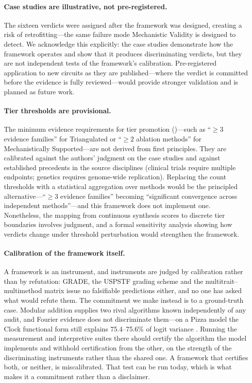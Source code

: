 \documentclass{article}
\begin{document}
\paragraph{Case studies are illustrative, not pre-registered.} The sixteen verdicts were assigned after the framework was designed, creating a risk of retrofitting---the same failure mode Mechanistic Validity is designed to detect. We acknowledge this explicitly: the case studies demonstrate how the framework operates and show that it produces discriminating verdicts, but they are not independent tests of the framework's calibration. Pre-registered application to new circuits as they are published---where the verdict is committed before the evidence is fully reviewed---would provide stronger validation and is planned as future work.

\paragraph{Tier thresholds are provisional.} The minimum evidence requirements for tier promotion ()---such as ``$\geq 3$ evidence families'' for Triangulated or ``$\geq 2$ ablation methods'' for Mechanistically Supported---are not derived from first principles. They are calibrated against the authors' judgment on the case studies and against established precedents in the source disciplines (clinical trials require multiple endpoints; genetics requires genome-wide replication). Replacing the count thresholds with a statistical aggregation over methods would be the principled alternative---``$\geq 3$ evidence families'' becoming ``significant convergence across independent methods''---and this framework does not implement one. Nonetheless, the mapping from continuous synthesis scores to discrete tier boundaries involves judgment, and a formal sensitivity analysis showing how verdicts change under threshold perturbation would strengthen the framework.

\paragraph{Calibration of the framework itself.} A framework is an instrument, and instruments are judged by calibration rather than by refutation: GRADE, the USPSTF grading scheme and the multitrait--multimethod matrix issue no falsifiable predictions either, and no one has asked what would refute them. The commitment we make instead is to a ground-truth case. Modular addition supplies two rival algorithms known independently of any audit, and Fourier evidence does not discriminate them---on a Pizza model the Clock functional form still explains 75.4--75.6\% of logit variance \citep[Table~2]{zhong2023clock}. Running the measurement and interpretive suites there should certify the algorithm the model implements and withhold certification from the other, on the strength of the discriminating instruments rather than the shared one. A framework that certifies both, or neither, is miscalibrated. That test can be run today, which is what makes it a commitment rather than a disclaimer.
\end{document}
